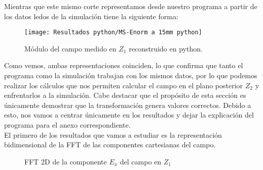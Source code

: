 \newpage

Mientras que este mismo corte representamos desde nuestro programa a partir de los datos ledos de la simulación tiene la siguiente forma:

\begin{figure}[h] 
  \centering
    \texttt{[image: Resultados python/MS-Enorm a 15mm python]}
    \caption{Módulo del campo medido en $Z_1$ reconstruido en python.}
    \label{MS-Diagrama de radiación de la antena simulada}
\end{figure}

Como vemos, ambas representaciones coinciden, lo que confirma que tanto el programa como la simulación trabajan con los mismos datos, por lo que podemos realizar los cálculos que nos permiten calcular el campo en el plano posterior $Z_2$ y enfrentarlos a la simulación. Cabe destacar que el propósito de esta sección es únicamente demostrar que la transformación genera valores correctos. Debido a esto, nos vamos a centrar únicamente en los resultados y dejar la explicación del programa para el anexo correspondiente.\\

El primero de los resultados que vamos a estudiar es la representación bidimensional de la FFT de las componentes cartesianas del campo. 

\begin{figure}[h]
    \centering
    
    \caption{FFT 2D de la componente $E_x$ del campo en $Z_1$}
    \label{FFT 2D Ex a 15mm}
\end{figure}


